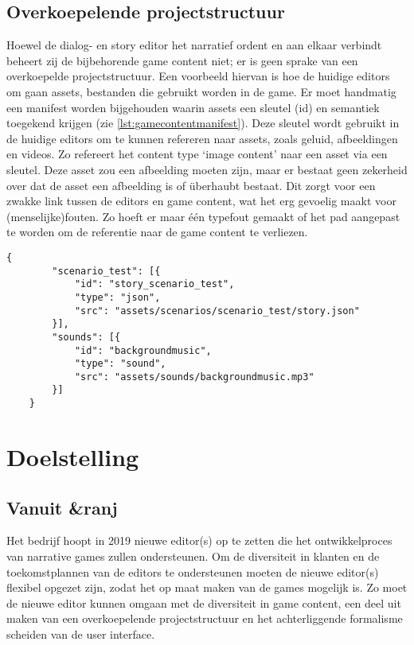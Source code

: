 \subsection{Overkoepelende projectstructuur}
Hoewel de dialog- en story editor het narratief ordent en aan elkaar verbindt beheert zij de bijbehorende game content niet; er is geen sprake van een overkoepelde projectstructuur. Een voorbeeld hiervan is hoe de huidige editors om gaan assets, bestanden die gebruikt worden in de game. Er moet handmatig een manifest worden bijgehouden waarin assets een sleutel (id) en semantiek toegekend krijgen (zie \autoref{lst:gamecontentmanifest}). Deze sleutel wordt gebruikt in de huidige editors om te kunnen refereren naar assets, zoals geluid, afbeeldingen en videos. Zo refereert het content type ‘image content’ naar een asset via een sleutel. Deze asset zou een afbeelding moeten zijn, maar er bestaat geen zekerheid over dat de asset een afbeelding is of überhaubt bestaat. Dit zorgt voor een zwakke link tussen de editors en game content, wat het erg gevoelig maakt voor (menselijke)fouten. Zo hoeft er maar één typefout gemaakt of het pad aangepast te worden om de referentie naar de game content te verliezen.

    \lstset{language=JSON}
    \begin{lstlisting}[caption={Game content manifest.},captionpos=b,label={lst:gamecontentmanifest}]
    {
        "scenario_test": [{
            "id": "story_scenario_test",
            "type": "json",
            "src": "assets/scenarios/scenario_test/story.json"
        }],
        "sounds": [{
            "id": "backgroundmusic",
            "type": "sound",
            "src": "assets/sounds/backgroundmusic.mp3"
        }]
    }
    \end{lstlisting}

\section{Doelstelling}
\label{sec:doelstelling}
\subsection{Vanuit \&ranj}
Het bedrijf hoopt in 2019 nieuwe editor(s) op te zetten die het ontwikkelproces van narrative games zullen ondersteunen. Om de diversiteit in klanten en de toekomstplannen van de editors te ondersteunen moeten de nieuwe editor(s) flexibel opgezet zijn, zodat het op maat maken van de games mogelijk is. Zo moet de nieuwe editor kunnen omgaan met de diversiteit in game content, een deel uit maken van een overkoepelende projectstructuur en het achterliggende formalisme scheiden van de user interface.


